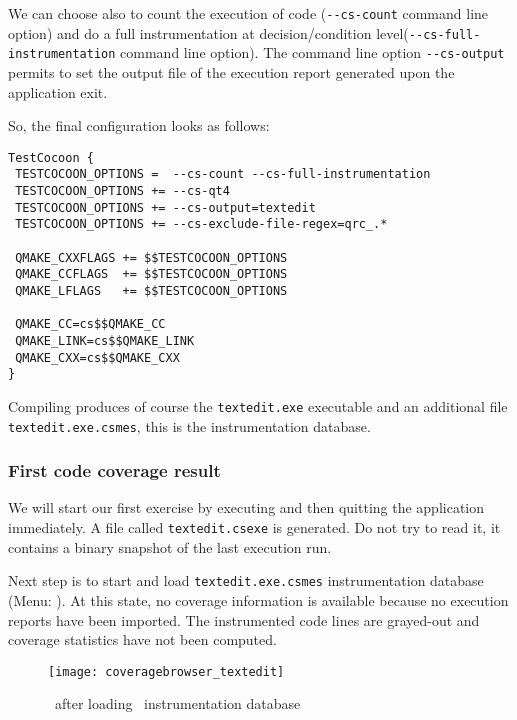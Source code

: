 We can choose also to count the execution of code (\verb$--cs-count$ command line
option) and do a full instrumentation at decision/condition
level(\verb$--cs-full-instrumentation$ command line option). The command line
option \verb$--cs-output$ permits to set the output file of the execution
report generated upon the application exit.



So, the final {\TestCocoon} configuration looks as follows:
\begin{figureenv}
\begin{verbatim}
TestCocoon {
 TESTCOCOON_OPTIONS =  --cs-count --cs-full-instrumentation
 TESTCOCOON_OPTIONS += --cs-qt4
 TESTCOCOON_OPTIONS += --cs-output=textedit
 TESTCOCOON_OPTIONS += --cs-exclude-file-regex=qrc_.*

 QMAKE_CXXFLAGS += $$TESTCOCOON_OPTIONS
 QMAKE_CCFLAGS  += $$TESTCOCOON_OPTIONS
 QMAKE_LFLAGS   += $$TESTCOCOON_OPTIONS

 QMAKE_CC=cs$$QMAKE_CC
 QMAKE_LINK=cs$$QMAKE_LINK
 QMAKE_CXX=cs$$QMAKE_CXX
}
\end{verbatim}
\caption{Final {\qmake} configuration}
\label{lst:qmake2}
\end{figureenv}

Compiling {\TextEdit} produces of course the \texttt{textedit.exe} executable and an additional file
\texttt{textedit.exe.csmes}, this is the  instrumentation database.

\subsubsection{First code coverage result}

We will start our first exercise by executing {\TextEdit} and then quitting the application immediately. A file called
\texttt{textedit.csexe} is generated.  Do not try to read it, it contains a binary
snapshot of the last execution run.

\sloppy Next step is to  start {\CoverageBrowser} and load \texttt{textedit.exe.csmes} instrumentation database
(Menu: ).  At this state, no coverage information is available
because no execution reports have been  imported. The instrumented code lines are
grayed-out and coverage statistics have not been computed. 

\begin{figure}[H]
  \begin{center}
    \texttt{[image: coveragebrowser\_textedit]}
  \end{center}
  \caption{\CoverageBrowser\ after loading \TextEdit\ instrumentation database}
  \label{fig:startup}
\end{figure}

